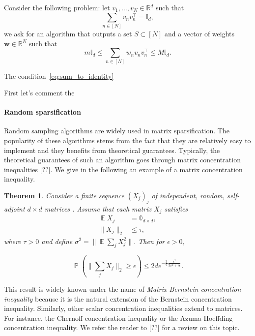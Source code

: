 \documentclass[twoside,11pt]{book}
\newtheorem{theorem}{Theorem}
\DeclareMathOperator{\Tran}{\intercal}
\DeclareMathOperator{\EX}{\mathbb{E}}
\DeclareMathOperator{\Prb}{\mathbb{P}}
\begin{document}
Consider the following problem: let $v_{1}, \dots, v_{N} \in \mathbb{R}^{d}$ such that
\begin{equation}
 \sum\limits_{n \in [N]} v_{n} v_{n}^{\Tran} = \mathbb{I}_{d},
\end{equation}
we ask for an algorithm that outputs a set $S \subset [N]$ and a vector of weights $\bm{w}\in \mathbb{R}^{N}$ such that
\begin{equation}
m \mathbb{I}_{d} \leq \sum\limits_{n \in [N]} w_{n}v_{n}v_{n}^{\Tran} \leq M \mathbb{I}_{d}.
\end{equation} 


The condition~\eqref{eq:sum_to_identity} 

First let's comment the 


\paragraph{Random sparsification}
Random sampling algorithms are widely used in matrix sparsification. The popularity of these algorithms stems from the fact that they are relatively easy to implement and they benefits from theoretical guarantees.  Typically, the theoretical guarantees of such an algorithm goes through matrix concentration inequalities [??]. We give in the following an example of a matrix concentration inequality. 


\begin{theorem}\label{thm:matrix_bernstein}
Consider a finite sequence $(X_{j})_{j}$ of independent, random, self-adjoint $d\times d$ matrices . Assume that each matrix $X_{j}$
satisfies 
\begin{align}
 \EX X_{j} &= \mathbb{0}_{d \times d},\\
 \|X_{j}\|_{2} &\leq \tau,
\end{align}
where $\tau >0$ and define $\sigma^{2} = \|\EX \sum\limits_{j} X_{j}^{2}\|$.
 Then for $\epsilon >0$, 

\begin{equation}
\Prb \left( \|\sum\limits_{j} X_{j}\|_{2} \geq \epsilon \right) \leq 2 d e^{-\frac{3}{2} \frac{\epsilon^{2}}{3\sigma^{2} + \tau \epsilon}}.
\end{equation}

\end{theorem}

This result is widely known under the name of \emph{Matrix Bernstein concentration inequality} because it is the natural extension of the Bernstein concentration inequality. Similarly, other scalar concentration inequalities extend to matrices. For instance, the Chernoff concentration inequality or the Azuma-Hoeffding concentration inequality. We refer the reader to [??] for a review on this topic. 
\end{document}
